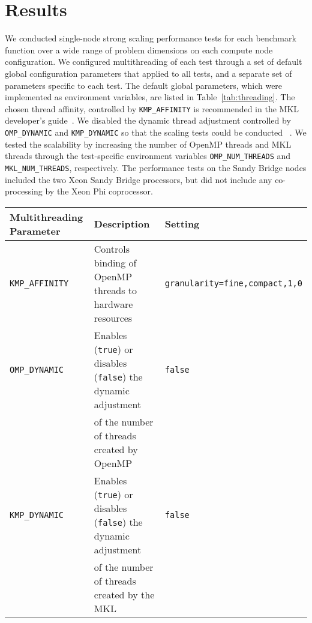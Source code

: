 \section{Results}
We conducted single-node strong scaling performance tests for each benchmark
  function over a wide range of problem dimensions on each compute node
  configuration.
We configured multithreading of each test through a set of default global
  configuration parameters that applied to all tests, and a separate set of
  parameters specific to each test.
The default global parameters, which were implemented as environment variables,
  are listed in Table~\ref{tab:threading}.
The chosen thread affinity, controlled by \texttt{KMP\_AFFINITY} is recommended
  in the MKL developer's guide~\cite{intel:mkl2017}.
We disabled the dynamic thread adjustment controlled by \texttt{OMP\_DYNAMIC}
  and \texttt{KMP\_DYNAMIC} so that the scaling tests could be conducted
  ~\cite{intel:cpp2015, intel:cpp2017, intel:mkl11_2, intel:mkl2017}.
We tested the scalability by increasing the number of OpenMP threads and MKL
  threads through the test-specific environment variables 
  \texttt{OMP\_NUM\_THREADS} and \texttt{MKL\_NUM\_THREADS}, respectively.
The performance tests on the Sandy Bridge nodes included the two Xeon Sandy
  Bridge processors, but did not include any co-processing by the Xeon Phi
  coprocessor. 

\begin{table*}
  \caption{Default Global Multithreading Parameters}
  \label{tab:threading}
  \begin{tabular}{lll}
    \toprule
    Multithreading Parameter & Description & Setting\\
    \midrule
    \texttt{KMP\_AFFINITY}   & Controls binding of OpenMP threads to hardware resources & \texttt{granularity=fine,compact,1,0}\\
    \texttt{OMP\_DYNAMIC}    & Enables (\texttt{true}) or disables (\texttt{false}) the dynamic adjustment   & \texttt{false}\\
                             & of the number of threads created by OpenMP &\\
    \texttt{KMP\_DYNAMIC}    & Enables (\texttt{true}) or disables (\texttt{false}) the dynamic adjustment & \texttt{false} \\
                             & of the number of threads created by the MKL &\\
    \bottomrule
  \end{tabular}
\end{table*}


